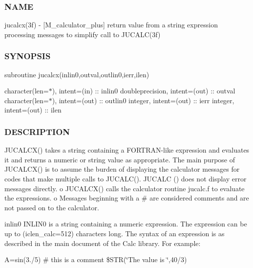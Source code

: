 \subsubsection*{N\+A\+ME}

jucalcx(3f) -\/ \mbox{[}M\+\_\+calculator\+\_\+plus\mbox{]} return value from a string expression processing messages to simplify call to J\+U\+C\+A\+L\+C(3f) \subsubsection*{S\+Y\+N\+O\+P\+S\+IS}

subroutine jucalcx(inlin0,outval,outlin0,ierr,ilen)

character(len=$\ast$), intent=(in) \+:\+: inlin0 doubleprecision, intent=(out) \+:\+: outval character(len=$\ast$), intent=(out) \+:\+: outlin0 integer, intent=(out) \+:\+: ierr integer, intent=(out) \+:\+: ilen

\subsubsection*{D\+E\+S\+C\+R\+I\+P\+T\+I\+ON}

J\+U\+C\+A\+L\+C\+X() takes a string containing a F\+O\+R\+T\+R\+A\+N-\/like expression and evaluates it and returns a numeric or string value as appropriate. The main purpose of J\+U\+C\+A\+L\+C\+X() is to assume the burden of displaying the calculator messages for codes that make multiple calls to J\+U\+C\+A\+L\+C(). J\+U\+C\+A\+LC () does not display error messages directly. o J\+U\+C\+A\+L\+C\+X() calls the calculator routine jucalc.\+f to evaluate the expressions. o Messages beginning with a \# are considered comments and are not passed on to the calculator.

inlin0 I\+N\+L\+I\+N0 is a string containing a numeric expression. The expression can be up to (iclen\+\_\+calc=512) characters long. The syntax of an expression is as described in the main document of the Calc library. For example\+:

\textquotesingle{}A=sin(3./5)\textquotesingle{} \textquotesingle{}\# this is a comment\textquotesingle{} \textquotesingle{}\$\+S\+TR(\char`\"{}\+The value is \char`\"{},40/3)\textquotesingle{}

